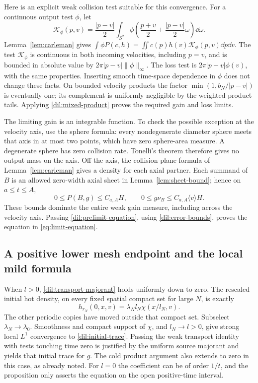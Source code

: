 Here is an explicit weak collision test suitable for this convergence.
For a continuous output test \(\phi\), let
\[
\mathcal K_\phi(p,v)
=\frac{|p-v|}{2}\int_{S^2}
 \phi\left(\frac{p+v}{2}+\frac{|p-v|}{2}\omega\right)\dd\omega.
\]
Lemma~\ref{lem:carleman} gives
\(\int\phi P(c,h)=\iint c(p)h(v)\mathcal K_\phi(p,v)\dd p\dd v\).
The test \(\mathcal K_\phi\) is continuous in both incoming
velocities, including \(p=v\), and is bounded in absolute value by
\(2\pi|p-v|\|\phi\|_\infty\). The loss test is
\(2\pi|p-v|\phi(v)\), with the same properties. Inserting smooth
time-space dependence in \(\phi\) does not change these facts.
On bounded velocity products the factor
\(\min(1,b_N/|p-v|)\) is eventually one; its complement is
uniformly negligible by the weighted product tails. Applying
\eqref{dil:mixed-product} proves the required gain and loss limits.

The limiting gain is an integrable function. To check the possible
exception at the velocity axis, use the sphere formula: every
nondegenerate diameter sphere meets that axis in at most two points,
which have zero sphere-area measure. A degenerate sphere has zero
collision rate. Tonelli's theorem therefore gives no output mass on
the axis. Off the axis, the collision-plane formula of
Lemma~\ref{lem:carleman} gives a density for each axial partner.
Each summand of \(B\) is an allowed zero-width axial sheet in
Lemma~\ref{lem:sheet-bound}; hence on
\(a\leq t\leq A\),
\[
0\leq P(B,g)\leq C_{a,A}H,
\qquad 0\leq g\nu_B\leq C_{a,A}\langle v\rangle H.
\]
These bounds dominate the entire weak gain measure, including across
the velocity axis. Passing \eqref{dil:prelimit-equation}, using
\eqref{dil:error-bounds}, proves the equation in
\eqref{eq:limit-equation}.

\subsection{A positive lower mesh endpoint and the local mild formula}

When \(l>0\), \eqref{dil:transport-majorant} holds uniformly down to
zero. The rescaled initial hot density, on every fixed spatial compact
set for large \(N\), is exactly
\[
h_{r_N}(0,x,v)=\lambda_N l_N\chi(x/l_N,v).
\]
The other periodic copies have moved outside that compact set.
Subselect \(\lambda_N\to\lambda_0\). Smoothness and compact support
of \(\chi\), and \(l_N\to l>0\), give strong local \(L^1\)
convergence to \eqref{dil:initial-trace}. Passing the weak transport
identity with tests touching time zero is justified by the uniform
source majorant and yields that initial trace for \(g\). The cold
product argument also extends to zero in this case, as already noted.
For \(l=0\) the coefficient can be of order \(1/t\), and the
proposition only asserts the equation on the open positive-time
interval.

